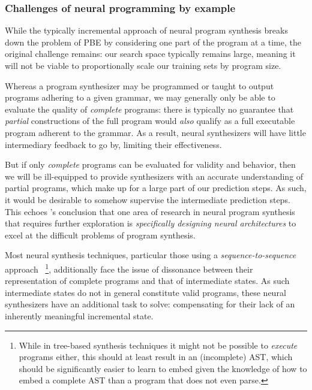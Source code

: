 \documentclass{article}
\begin{document}
\subsubsection{Challenges of neural programming by example} \label{sec:challengesnps}

While the typically incremental approach of neural program synthesis breaks down the problem of PBE by considering one part of the program at a time, the original challenge remains:
our search space typically remains large, meaning it will not be viable to proportionally scale our training sets by program size.

Whereas a program synthesizer may be programmed or taught to output programs adhering to a given grammar,
we may generally only be able to evaluate the quality of \emph{complete} programs:
there is typically no guarantee that \emph{partial} constructions of the full program would \emph{also} qualify as a full executable program adherent to the grammar.
As a result, neural synthesizers will have little intermediary feedback to go by, limiting their effectiveness.

But if only \emph{complete} programs can be evaluated for validity and behavior, then 
we will be ill-equipped to provide synthesizers with an accurate understanding of partial programs,
which make up for a large part of our prediction steps.
As such, it would be desirable to somehow supervise the intermediate prediction steps.
This echoes \citet{nps}'s conclusion that one area of research in neural program synthesis that requires further exploration is
\emph{specifically designing neural architectures} to excel at the difficult problems of program synthesis.


Most neural synthesis techniques, particular those using a \emph{sequence-to-sequence} approach%
~\footnote{
    While in tree-based synthesis techniques it might not be possible to \emph{execute} programs either,
    this should at least result in an (incomplete) AST,
    which should be significantly easier to learn to embed given the knowledge of how to embed a complete AST than a program that does not even parse.
},
additionally face the issue of dissonance between their representation of complete programs and that of intermediate states.
As such intermediate states do not in general constitute valid programs,
these neural synthesizers have an additional task to solve:
compensating for their lack of an inherently meaningful incremental state.
\end{document}

